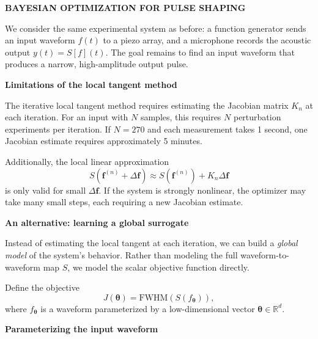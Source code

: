 \documentclass[11pt]{article}
\begin{document}
\begin{center}
\textbf{\Large BAYESIAN OPTIMIZATION FOR PULSE SHAPING}
\end{center}

\vspace{0.5em}

\noindent
We consider the same experimental system as before: a function generator sends an input waveform $f(t)$ to a piezo array, and a microphone records the acoustic output $y(t) = S[f](t)$.
The goal remains to find an input waveform that produces a narrow, high-amplitude output pulse.

\vspace{1em}
\begin{center}
\textbf{Limitations of the local tangent method}
\end{center}

The iterative local tangent method requires estimating the Jacobian matrix $K_n$ at each iteration.
For an input with $N$ samples, this requires $N$ perturbation experiments per iteration.
If $N = 270$ and each measurement takes 1 second, one Jacobian estimate requires approximately 5 minutes.

Additionally, the local linear approximation
\[
S(\mathbf{f}^{(n)} + \Delta\mathbf{f}) \approx S(\mathbf{f}^{(n)}) + K_n \Delta\mathbf{f}
\]
is only valid for small $\Delta\mathbf{f}$.
If the system is strongly nonlinear, the optimizer may take many small steps, each requiring a new Jacobian estimate.

\vspace{1em}
\begin{center}
\textbf{An alternative: learning a global surrogate}
\end{center}

Instead of estimating the local tangent at each iteration, we can build a \emph{global model} of the system's behavior.
Rather than modeling the full waveform-to-waveform map $S$, we model the scalar objective function directly.

Define the objective
\[
J(\bm{\theta}) = \text{FWHM}(S(f_{\bm{\theta}})),
\]
where $f_{\bm{\theta}}$ is a waveform parameterized by a low-dimensional vector $\bm{\theta} \in \mathbb{R}^d$.

\begin{center}
\end{center}

\vspace{1em}
\begin{center}
\textbf{Parameterizing the input waveform}
\end{center}
\end{document}
